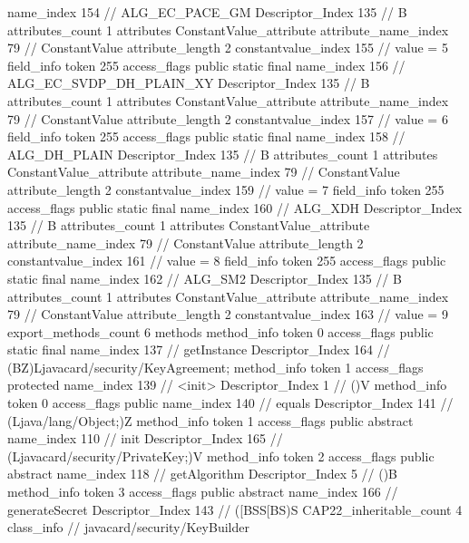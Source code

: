 {{{{{				name_index	154		// ALG_EC_PACE_GM
				Descriptor_Index	135		// B
				attributes_count	1
				attributes {
				ConstantValue_attribute {
					attribute_name_index	79		// ConstantValue
					attribute_length	2
					constantvalue_index	155		// value = 5
				}
				}
			}
			field_info {
				token	255
				access_flags	public static final
				name_index	156		// ALG_EC_SVDP_DH_PLAIN_XY
				Descriptor_Index	135		// B
				attributes_count	1
				attributes {
				ConstantValue_attribute {
					attribute_name_index	79		// ConstantValue
					attribute_length	2
					constantvalue_index	157		// value = 6
				}
				}
			}
			field_info {
				token	255
				access_flags	public static final
				name_index	158		// ALG_DH_PLAIN
				Descriptor_Index	135		// B
				attributes_count	1
				attributes {
				ConstantValue_attribute {
					attribute_name_index	79		// ConstantValue
					attribute_length	2
					constantvalue_index	159		// value = 7
				}
				}
			}
			field_info {
				token	255
				access_flags	public static final
				name_index	160		// ALG_XDH
				Descriptor_Index	135		// B
				attributes_count	1
				attributes {
				ConstantValue_attribute {
					attribute_name_index	79		// ConstantValue
					attribute_length	2
					constantvalue_index	161		// value = 8
				}
				}
			}
			field_info {
				token	255
				access_flags	public static final
				name_index	162		// ALG_SM2
				Descriptor_Index	135		// B
				attributes_count	1
				attributes {
				ConstantValue_attribute {
					attribute_name_index	79		// ConstantValue
					attribute_length	2
					constantvalue_index	163		// value = 9
				}
				}
			}
			}
			export_methods_count	6
			methods {
				method_info {
					token	0
					access_flags	public static final
					name_index	137		// getInstance
					Descriptor_Index	164		// (BZ)Ljavacard/security/KeyAgreement;
				}
				method_info {
					token	1
					access_flags	protected
					name_index	139		// <init>
					Descriptor_Index	1		// ()V
				}
				method_info {
					token	0
					access_flags	public
					name_index	140		// equals
					Descriptor_Index	141		// (Ljava/lang/Object;)Z
				}
				method_info {
					token	1
					access_flags	public abstract
					name_index	110		// init
					Descriptor_Index	165		// (Ljavacard/security/PrivateKey;)V
				}
				method_info {
					token	2
					access_flags	public abstract
					name_index	118		// getAlgorithm
					Descriptor_Index	5		// ()B
				}
				method_info {
					token	3
					access_flags	public abstract
					name_index	166		// generateSecret
					Descriptor_Index	143		// ([BSS[BS)S
				}
			}
			CAP22_inheritable_count	4
		}
		class_info {		// javacard/security/KeyBuilder
}}}
